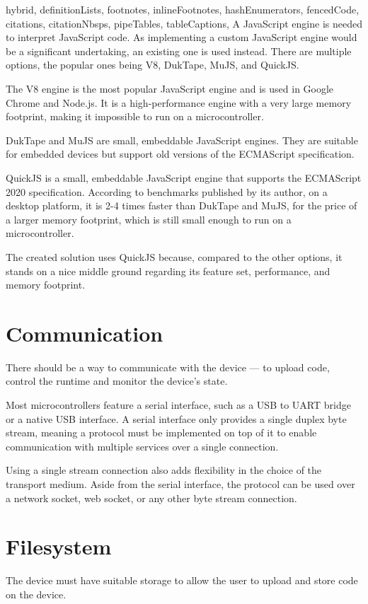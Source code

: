 \begin{markdown*}{%
  hybrid,
  definitionLists,
  footnotes,
  inlineFootnotes,
  hashEnumerators,
  fencedCode,
  citations,
  citationNbsps,
  pipeTables,
  tableCaptions,
}
A JavaScript engine is needed to interpret JavaScript code. As implementing a custom JavaScript engine would be a significant undertaking, an existing one is used instead. There are multiple options, the popular ones being V8, DukTape, MuJS, and QuickJS.

The V8 engine is the most popular JavaScript engine and is used in Google Chrome and Node.js. It is a high-performance engine with a very large memory footprint, making it impossible to run on a microcontroller.

DukTape and MuJS are small, embeddable JavaScript engines. They are suitable for embedded devices but support old versions of the ECMAScript specification.

QuickJS is a small, embeddable JavaScript engine that supports the ECMAScript 2020 specification. According to benchmarks published by its author\cite{quickjs-bench}, on a desktop platform, it is 2-4 times faster than DukTape and MuJS, for the price of a larger memory footprint, which is still small enough to run on a microcontroller.

The created solution uses QuickJS because, compared to the other options, it stands on a nice middle ground regarding its feature set, performance, and memory footprint.

\section{Communication}

There should be a way to communicate with the device --- to upload code, control the runtime and monitor the device's state.

Most microcontrollers feature a serial interface, such as a USB to UART bridge or a native USB interface. A serial interface only provides a single duplex byte stream, meaning a protocol must be implemented on top of it to enable communication with multiple services over a single connection.

Using a single stream connection also adds flexibility in the choice of the transport medium. Aside from the serial interface, the protocol can be used over a network socket, web socket, or any other byte stream connection.

\section{Filesystem}

The device must have suitable storage to allow the user to upload and store code on the device.


\end{markdown*}
